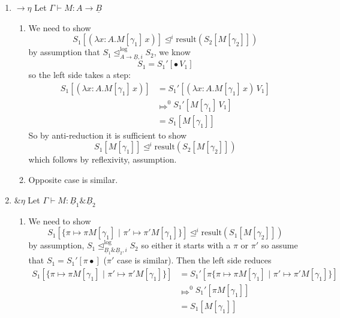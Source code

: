 \documentclass[acmsmall,nonacm]{acmart}
\renewcommand{\u}{\underline}
\newcommand{\pipe}{\,\,|\,\,}
\newcommand{\apreorder}{\trianglelefteq}
\newcommand{\ix}[2]{\mathrel{#1^{#2}}}
\newcommand{\itylrof}[3]{\ilrof{#1}{#3,#2}}
\newcommand{\ilrof}[2]{\mathrel{{#1}^{\text{log}}_{#2}}}
\newcommand{\itylr}[2]{\itylrof{\apreorder}{#1}{#2}}
\newcommand{\bigstepsin}[1]{\mathrel{\Mapsto^{#1}}}
\newcommand{\pair}[2]{\{ \pi \mapsto {#1} \pipe \pi' \mapsto {#2}\}}
\newcommand{\result}{\text{result}}
\newcommand{\bindXtoYinZ}[2]{\kw{bind}#2 \leftarrow #1;}
\newcommand{\kw}[1]{\texttt{#1}\,\,}
\newcommand{\ret}{\kw{ret}}
\newcommand{\with}{\mathbin{\&}}
\begin{document}
{\begin{longproof}
\begin{enumerate}
\begin{enumerate}
      So assume $V_1 \itylr j A V_2$ for some $j\leq i$, then we need to show
      \[ S_1[\bindXtoYinZ \bullet {\ret V_1} \ret x] \ix\apreorder j \result(S_2[\ret V_2])
      \]
      The left side takes a step:
      \[ S_1[\bindXtoYinZ \bullet {\ret V_1} \ret x] \bigstepsin{0} S_1[\ret V_1]\]
      so by anti-reduction it is sufficient to show
      \[ S_1[\ret V_1] \ix\apreorder j \result(S_2[\ret V_2])\]
      which follows by assumption
    \item Opposite case is similar.
    \end{enumerate}
  \item $\to\eta$ Let $\Gamma \vdash M : A \to \u B$
    \begin{enumerate}
    \item We need to show
      \[ S_1[(\lambda x:A. M[\gamma_1]\, x)] \ix\apreorder i \result(S_2[M[\gamma_2]])
      \]
      by assumption that $S_1 \itylr i {A \to \u B} S_2$, we know
      \[ S_1 = S_1'[\bullet\, V_1]\]
      so the left side takes a step:
      \begin{align*}
         S_1[(\lambda x:A. M[\gamma_1]\, x)]
         &= S_1'[(\lambda x:A. M[\gamma_1]\, x)\, V_1]\\
         &\bigstepsin{0} S_1'[M[\gamma_1]\, V_1]\\
         &= S_1[M[\gamma_1]]
      \end{align*}
      So by anti-reduction it is sufficient to show
      \[ S_1[M[\gamma_1]] \ix\apreorder i \result(S_2[M[\gamma_2]])\]
      which follows by reflexivity, assumption.
    \item Opposite case is similar.
    \end{enumerate}
  \item $\with\eta$ Let $\Gamma \vdash M : \u B_1 \with \u B_2$
    \begin{enumerate}
    \item We need to show
      \[ S_1[\pair{\pi M[\gamma_1]}{\pi' M[\gamma_1]}] \ix\apreorder i \result(S_1[M[\gamma_2]]) \]
      by assumption, $S_1 \itylr i {\u B_1 \with \u B_2} S_2$ so
      either it starts with a $\pi$ or $\pi'$ so assume that $S_1 =
      S_1'[\pi \bullet]$ ($\pi'$ case is similar).
      Then the left side reduces
      \begin{align*}
        S_1[\pair{\pi M[\gamma_1]}{\pi' M[\gamma_1]}]
        &= S_1'[\pi\pair{\pi M[\gamma_1]}{\pi' M[\gamma_1]}]\\
        &\bigstepsin{0} S_1'[\pi M[\gamma_1]]\\
        &= S_1[M[\gamma_1]]

\end{align*}
\end{enumerate}
\end{enumerate}
\end{longproof}}
\end{document}
